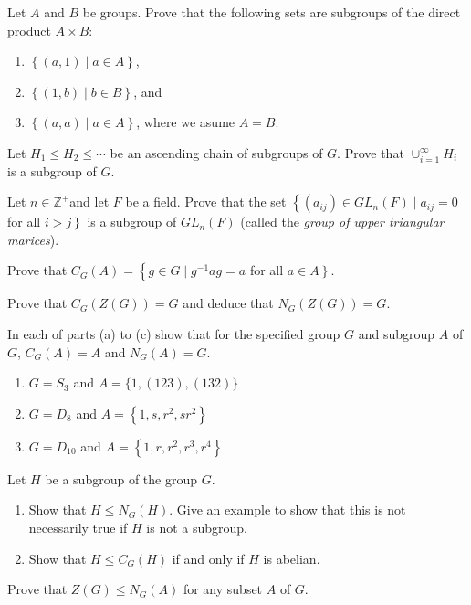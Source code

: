 \begin{questions}
\question
Let \(A\) and \(B\) be groups. Prove that the following sets are subgroups of the direct product \(A \times B\):
\begin{enumerate}[label=(\alph*)]
    \item \(\left\{ (a,1) \mid a\in A \right\}\),
    \item \(\left\{ (1,b) \mid b\in B \right\}\), and
    \item \(\left\{ (a,a) \mid a\in A \right\}\), where we asume \(A= B\).
\end{enumerate}




\question
Let \(H_1 \leq H_2 \leq \cdots\) be an ascending chain of subgroups of \(G\). Prove that \(\cup_{i=1}^{\infty} H_i\) is a subgroup of \(G\).

\question
Let \(n \in \mathbb{Z}^{+}\)and let \(F\) be a field. Prove that the set \(\left\{\left(a_{i j}\right) \in G L_n(F) \mid a_{i j}=0\right.\) for all \(\left.i>j\right\}\) is a subgroup of \(G L_n(F)\) (called the \textit{group of upper triangular marices}).



\question
Prove that \(C_G(A)=\left\{g \in G \mid g^{-1} a g=a\right.\) for all \(\left.a \in A\right\}\).

\question
Prove that \(C_G(Z(G))=G\) and deduce that \(N_G(Z(G))=G\).


\question
In each of parts (a) to (c) show that for the specified group \(G\) and subgroup \(A\) of \(G\), \(C_G(A)=A\) and \(N_G(A)=G\).
\begin{enumerate}[label=(\alph*)]
    \item \(G=S_3\) and \(A=\{1,(123),(132)\}\)
    \item \(G=D_8\) and \(A=\left\{1, s, r^2, s r^2\right\}\)
    \item \(G=D_{10}\) and \(A=\left\{1, r, r^2, r^3, r^4\right\}\)
\end{enumerate}



\question Let \(H\) be a subgroup of the group \(G\).
\begin{enumerate}[label=(\alph*)]
    \item Show that \(H \leq N_G(H)\). Give an example to show that this is not necessarily true if \(H\) is not a subgroup.
    \item Show that \(H \leq C_G(H)\) if and only if \(H\) is abelian.
\end{enumerate}












\question
Prove that \(Z(G) \leq N_G(A)\) for any subset \(A\) of \(G\).


\end{questions}